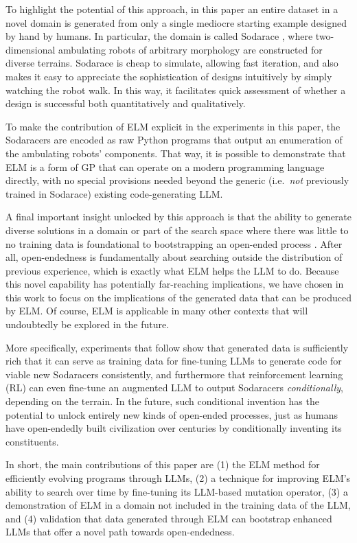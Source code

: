\documentclass{article}
\begin{document}
To highlight the potential of this approach, in this paper an entire dataset in a novel domain is generated from only a single mediocre starting example designed by hand by humans.  In particular, the domain is called Sodarace \cite{mcowan:sodarace,szerlip:iesor}, where two-dimensional
ambulating robots of arbitrary morphology are constructed for diverse
terrains.  Sodarace is cheap to simulate, allowing
fast iteration, and also makes it easy to appreciate the sophistication
of designs intuitively by simply watching the robot walk. In this way,
it facilitates quick assessment of whether a design is successful both
quantitatively and qualitatively.

To make the contribution of ELM explicit in the experiments in this paper, the Sodaracers are encoded as raw Python programs that output an enumeration of the ambulating robots' components.  That way, it is possible to demonstrate that ELM is a form of GP that can operate on a modern programming language directly, with no special provisions needed beyond the generic (i.e.\ \emph{not} previously trained in Sodarace) existing code-generating LLM.

A final important insight unlocked by this approach is that the ability to generate diverse solutions in a domain or part of the search space where there was little to no training data is foundational to bootstrapping an open-ended process \cite{bedau:open,standish:ijcia03,stanley:oreilly17}.  After all, open-endedness is fundamentally about searching outside the distribution of previous experience, which is exactly what ELM helps the LLM to do.  Because this novel capability has potentially far-reaching implications, we have chosen in this work to focus on the implications of the generated data that can be produced by ELM. Of course, ELM is applicable in many other contexts that will undoubtedly be explored in the future.

More specifically, experiments that follow show that generated data is sufficiently rich that it can serve as training data for fine-tuning LLMs to generate code for viable new Sodaracers consistently, and furthermore that reinforcement learning (RL) can even fine-tune an augmented LLM to output Sodaracers \emph{conditionally}, depending on the terrain.  In the future, such conditional invention has the potential to unlock entirely new kinds of open-ended processes, just as humans have open-endedly built civilization over centuries by conditionally inventing its constituents.

In short, the main contributions of this paper are (1) the ELM method for efficiently evolving programs through LLMs, (2) a technique for improving ELM's ability to search over time by fine-tuning its LLM-based mutation operator,
(3) a demonstration of ELM in a domain not included in the training data of the LLM, and (4) validation that data generated through ELM can bootstrap enhanced LLMs that offer a novel path towards open-endedness.  
\end{document}
